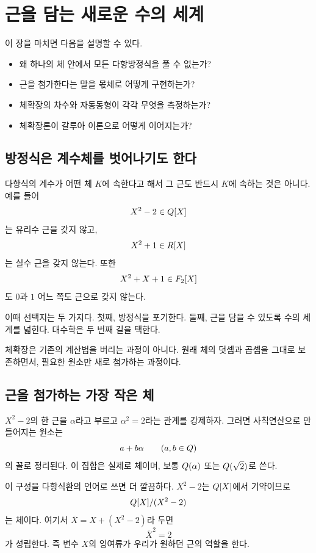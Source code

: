 \chapter{근을 담는 새로운 수의 세계}
\label{chap:v2-motivation}

\begin{learninggoal}
이 장을 마치면 다음을 설명할 수 있다.
\begin{itemize}
  \item 왜 하나의 체 안에서 모든 다항방정식을 풀 수 없는가?
  \item 근을 첨가한다는 말을 몫체로 어떻게 구현하는가?
  \item 체확장의 차수와 자동동형이 각각 무엇을 측정하는가?
  \item 체확장론이 갈루아 이론으로 어떻게 이어지는가?
\end{itemize}
\end{learninggoal}

\section{방정식은 계수체를 벗어나기도 한다}

다항식의 계수가 어떤 체 $K$에 속한다고 해서 그 근도 반드시 $K$에 속하는 것은 아니다. 예를 들어
\[
  X^2-2\in Q[X]
\]
는 유리수 근을 갖지 않고,
\[
  X^2+1\in R[X]
\]
는 실수 근을 갖지 않는다. 또한
\[
  X^2+X+1\in F_2[X]
\]
도 $0$과 $1$ 어느 쪽도 근으로 갖지 않는다.

이때 선택지는 두 가지다. 첫째, 방정식을 포기한다. 둘째, 근을 담을 수 있도록 수의 세계를 넓힌다. 대수학은 두 번째 길을 택한다.

\begin{keyidea}
체확장은 기존의 계산법을 버리는 과정이 아니다. 원래 체의 덧셈과 곱셈을 그대로 보존하면서, 필요한 원소만 새로 첨가하는 과정이다.
\end{keyidea}

\section{근을 첨가하는 가장 작은 체}

$X^2-2$의 한 근을 $\alpha$라고 부르고 $\alpha^2=2$라는 관계를 강제하자. 그러면 사칙연산으로 만들어지는 원소는
\[
  a+b\alpha\qquad(a,b\in Q)
\]
의 꼴로 정리된다. 이 집합은 실제로 체이며, 보통 $Q(\alpha)$ 또는 $Q(\sqrt2)$로 쓴다.

이 구성을 다항식환의 언어로 쓰면 더 깔끔하다. $X^2-2$는 $Q[X]$에서 기약이므로
\[
  Q[X]/(X^2-2)
\]
는 체이다. 여기서 $\overline X=X+(X^2-2)$라 두면
\[
  \overline X^2=2
\]
가 성립한다. 즉 변수 $X$의 잉여류가 우리가 원하던 근의 역할을 한다.

